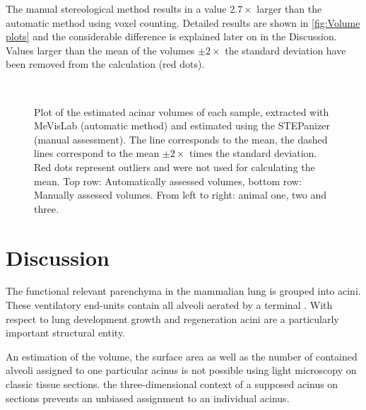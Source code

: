\documentclass[paper=a4,twocolumn=true,DIV=calc,abstract,english]{scrartcl}
\newcommand{\imsize}{\linewidth}
\newcommand{\biggerthan}{2\xspace} %
\newcommand{\difference}{2.7\xspace} %
\begin{document}
The manual stereological method results in a value \(\difference\times\) larger than the automatic method using voxel counting.
Detailed results are shown in \autoref{fig:Volume plots} and the considerable difference is explained later on in the Discussion.
Values larger than the mean of the volumes \(\pm\biggerthan\times\) the standard deviation have been removed from the calculation (red dots).

\renewcommand{\imsize}{0.35\textwidth}
\begin{figure}[htb]
	\centering
	\subfloat{
		}\hfill%
	\subfloat{
		
		}\hfill%
	\subfloat{
		
		}\\%
	\subfloat{
		
		}\hfill%
	\subfloat{
		
		}\hfill%
	\subfloat{
		
		}%
	\caption{Plot of the estimated acinar volumes of each sample, extracted with MeVisLab (automatic method) and estimated using the STEPanizer (manual assessment).
		The line corresponds to the mean, the dashed lines correspond to the mean $\pm\biggerthan\times$ times the standard deviation.
		Red dots represent outliers and were not used for calculating the mean.
		Top row: Automatically assessed volumes, bottom row: Manually assessed volumes.
		From left to right: animal one, two and three.}
	\label{fig:Volume plots}
\end{figure}

\section{Discussion}\label{sec:discussion}
The functional relevant parenchyma in the mammalian lung is grouped into acini.
These ventilatory end-units contain all alveoli aerated by a terminal .
With respect to lung development growth and regeneration acini are a particularly important structural entity.

An estimation of the volume, the surface area as well as the number of contained alveoli assigned to one particular acinus is not possible using light microscopy on classic tissue sections.
 the three-dimensional context of a supposed acinus on sections  prevents an unbiased assignment to an individual acinus.
\end{document}

